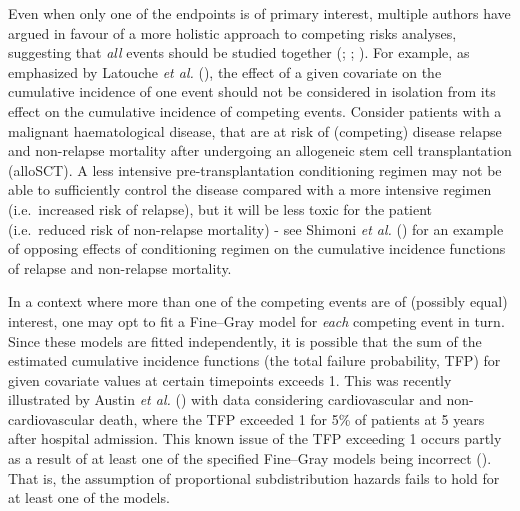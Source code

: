 \documentclass[
  letterpaper,
  paper=240mm:170mm,
  twoside=true,
  open=right,
  fontsize=10pt,
  pagesize=false,
  BCOR=15mm,
  DIV=14,
  headinclude=true,
  footinclude=false,
  headsepline=on]{scrbook}
\begin{document}
Even when only one of the endpoints is of primary interest, multiple
authors have argued in favour of a more holistic approach to competing
risks analyses, suggesting that \emph{all} events should be studied
together (;
; ). For example, as emphasized by Latouche \emph{et
al.} (), the
effect of a given covariate on the cumulative incidence of one event
should not be considered in isolation from its effect on the cumulative
incidence of competing events. Consider patients with a malignant
haematological disease, that are at risk of (competing) disease relapse
and non-relapse mortality after undergoing an allogeneic stem cell
transplantation (alloSCT). A less intensive pre-transplantation
conditioning regimen may not be able to sufficiently control the disease
compared with a more intensive regimen (i.e.~increased risk of relapse),
but it will be less toxic for the patient (i.e.~reduced risk of
non-relapse mortality) - see Shimoni \emph{et al.}
() for an example of
opposing effects of conditioning regimen on the cumulative incidence
functions of relapse and non-relapse mortality.

In a context where more than one of the competing events are of
(possibly equal) interest, one may opt to fit a Fine--Gray model for
\emph{each} competing event in turn. Since these models are fitted
independently, it is possible that the sum of the estimated cumulative
incidence functions (the total failure probability, TFP) for given
covariate values at certain timepoints exceeds 1. This was recently
illustrated by Austin \emph{et al.}
() with data
considering cardiovascular and non-cardiovascular death, where the TFP
exceeded 1 for 5\% of patients at 5 years after hospital admission. This
known issue of the TFP exceeding 1 occurs partly as a result of at least
one of the specified Fine--Gray models being incorrect
(). That is, the assumption of proportional
subdistribution hazards fails to hold for at least one of the models.
\end{document}
